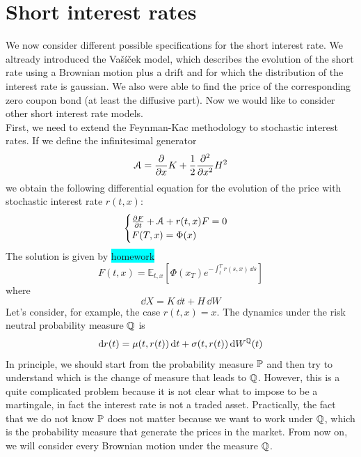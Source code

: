 \section{Short interest rates} %
We now consider different possible specifications for the short interest rate. We altready introduced the Vašíček model, which describes the evolution of the short rate using a Brownian motion plus a drift and for which the distribution of the interest rate is gaussian. We also were able to find the price of the corresponding zero coupon bond (at least the diffusive part). Now we would like to consider other short interest rate models. \\
First, we need to extend the Feynman-Kac methodology to stochastic interest rates. If we define the infinitesimal generator
\begin{equation*}
    \mathcal{A} = \pdv{}{x}K + \frac{1}{2}\pdv[2]{}{x}H^2
\end{equation*}
we obtain the following differential equation for the evolution of the price with stochastic interest rate $r(t,x)$:
\begin{equation}
    \begin{cases}
        \pdv{F}{t} + \mathcal{A} + r(t,x)F = 0 \\
        F(T,x) = \Phi(x)
    \end{cases}
\end{equation}
The solution is given by \colorbox{cyan}{homework}
\begin{equation}
    F(t,x) = \mathbb{E}_{t,x}\left[\Phi(x_T)e^{-\int_t^T r(s,x)\,\dd s}\right]
\end{equation}
where
\begin{equation}
    \dd X = K\,\dd t + H\,\dd W
\end{equation}
Let's consider, for example, the case $r(t,x) = x$. The dynamics under the risk neutral probability measure $\mathbb{Q}$ is
\begin{equation}
    \dd r(t) = \mu(t,r(t))\,\dd t + \sigma(t,r(t))\,\dd W^{\mathbb{Q}}(t)
\end{equation}
In principle, we should start from the probability measure $\mathbb{P}$ and then try to understand which is the change of measure that leads to $\mathbb{Q}$. However, this is a quite complicated problem because it is not clear what to impose to be a martingale, in fact the interest rate is not a traded asset. Practically, the fact that we do not know $\mathbb{P}$ does not matter because we want to work under $\mathbb{Q}$, which is the probability measure that generate the prices in the market. From now on, we will consider every Brownian motion under the measure $\mathbb{Q}$.

